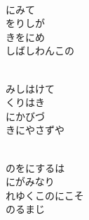 \documentclass[10pt,b5j]{tarticle} %
\begin{document}
\vspace{1.5em} %
\newcommand{\linespace}{0.5em} %
\newcommand{\blocksize}{0.5\hsize} %
\newcommand{\itemmargin}{6em} %
\begin{enumerate} %
    \setlength{\itemindent}{\itemmargin} %
    \begin{minipage}[c]{\blocksize}
    
        \vspace{\linespace}
        \item~\\
        にみて\\
        をりしが\\
        きをにめ\\
        しばしわんこの
        
        \vspace{\linespace}
        \item~\\
        みしはけて\\
        くりはき\\
        にかびづ\\
        きにやさずや
        
        \vspace{\linespace}
        \item~\\
        のをにするは\\
        にがみなり\\
        れゆくこのにこそ\\
        のるまじ
    
    \end{minipage}
\end{enumerate} %
\end{document}
